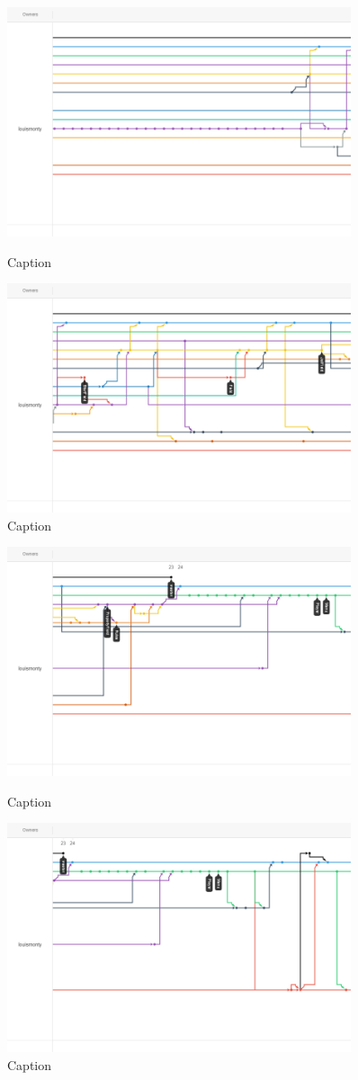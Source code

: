 \begin{figure}
    \includegraphics[width=0.9\textwidth]{Report/root/9.png}
    \caption{Caption}
    \includegraphics[width=0.9\textwidth]{Report/root/10.png}
    \caption{Caption}
    \end{figure}
\begin{figure}
    \includegraphics[width=0.9\textwidth]{Report/root/11.png}
    \caption{Caption}
    \includegraphics[width=0.9\textwidth]{Report/root/12.png}
    \caption{Caption}
    \end{figure}
    